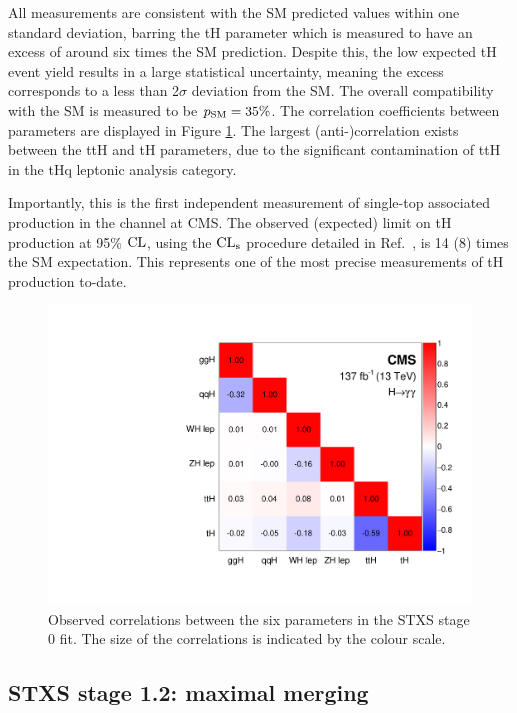 All measurements are consistent with the SM predicted values within one standard deviation, barring the tH parameter which is measured to have an excess of around six times the SM prediction. Despite this, the low expected tH event yield results in a large statistical uncertainty, meaning the excess corresponds to a less than 2$\sigma$ deviation from the SM. The overall compatibility with the SM is measured to be $p_{\rm{SM}}=35\%$. The correlation coefficients between parameters are displayed in Figure \ref{fig:stage0_correlations}. The largest (anti-)correlation exists between the ttH and tH parameters, due to the significant contamination of ttH in the tHq leptonic analysis category.

Importantly, this is the first independent measurement of single-top associated production in the \Hgg channel at CMS. The observed (expected) limit on tH production at 95\% $\rm{CL}$, using the $\rm{CL}_s$ procedure detailed in Ref.~\cite{CMS-NOTE-2011-005}, is 14 (8) times the SM expectation. This represents one of the most precise measurements of tH production to-date.

\begin{figure}[htbp]
  \centering
  \includegraphics[width=.5\textwidth]{Figures/hgg_results/stage0_correlations.pdf}
  \caption[Correlations in the STXS stage 0 parameters]
  {
    Observed correlations between the six parameters in the STXS stage 0 fit. The size of the correlations is indicated by the colour scale.
  }
  \label{fig:stage0_correlations}
\end{figure}

\subsection{STXS stage 1.2: maximal merging}

